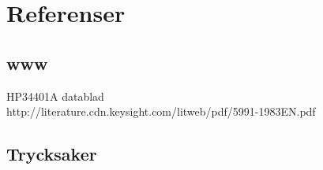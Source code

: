 \documentclass[11pt,a4paper]{article}
\begin{document}
\section{Referenser}\label{refs}

\subsection{www}\label{interwebs}
HP34401A datablad\\
http://literature.cdn.keysight.com/litweb/pdf/5991-1983EN.pdf

\subsection{Trycksaker}\label{literature} %


\end{document}
